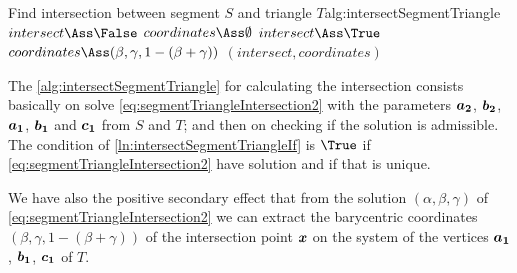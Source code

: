 \documentclass[dissertation.tex]{subfiles}
\begin{document}
\begin{algo}{Find intersection between segment $S$ and triangle $T$}{alg:intersectSegmentTriangle}
  \State $intersect\Ass\False$
  \State $coordinates\Ass\emptyset$
  \label{ln:intersectSegmentTriangleIf}
  \State $intersect\Ass\True$
  \State $coordinates\Ass(\beta, \gamma, 1-(\beta+\gamma))$
  \EndIf
  \EndIf
  \State\Return $(intersect, coordinates)$
  \EndFunction
\end{algo}
The \cref{alg:intersectSegmentTriangle} for calculating the
intersection consists basically on solve
\cref{eq:segmentTriangleIntersection2} with the parameters $\boldsymbol{a_2}$,
$\boldsymbol{b_2}$, $\boldsymbol{a_1}$, $\boldsymbol{b_1}$ and $\boldsymbol{c_1}$ from $S$ and $T$;
and then on checking if the solution is admissible. The condition of
\cref{ln:intersectSegmentTriangleIf} is $\True$ if
\cref{eq:segmentTriangleIntersection2} have solution and if that
is unique.

We have also the positive secondary effect that from the solution
$(\alpha,\beta,\gamma)$ of \cref{eq:segmentTriangleIntersection2} we
can extract the barycentric coordinates $(\beta, \gamma,
1-(\beta+\gamma))$ of the intersection point $\boldsymbol{x}$ on the system of
the vertices $\boldsymbol{a_1}$, $\boldsymbol{b_1}$, $\boldsymbol{c_1}$ of $T$.
\end{document}
